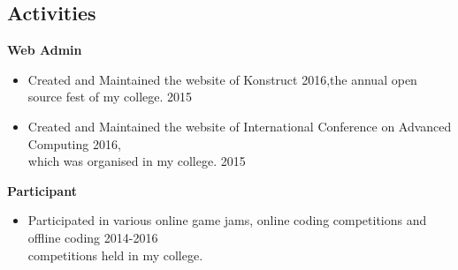 \documentclass[margin, centered]{res}
\begin{document}
\begin{resume}
\section{Activities}
\textbf{Web Admin}
\begin{itemize}[leftmargin=*]
\item Created and Maintained the website of Konstruct 2016,the  annual open source fest of my college. \hfill 2015
\item Created and Maintained the website of International Conference on Advanced Computing 2016,\\ which was organised in my college. \hfill 2015
\end{itemize} 
\textbf{Participant}
\begin{itemize}[leftmargin=*]
\item Participated in various online game jams, online coding competitions and offline coding \hfill 2014-2016 \\    competitions held in my college. 
\end{itemize}

\end{resume}
\end{document}
